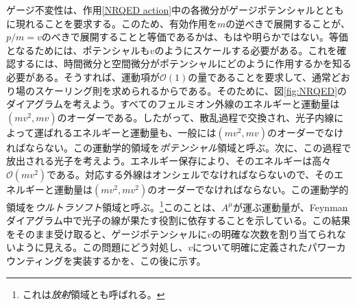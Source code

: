 ゲージ不変性は、作用\eqref{NRQED action}中の各微分がゲージポテンシャルとともに現れることを要求する。このため、有効作用を$m$の逆べきで展開することが、$p / m = v$のべきで展開することと等価であるかは、もはや明らかではない。等価となるためには、ポテンシャルも$v$のようにスケールする必要がある。これを確認するには、時間微分と空間微分がポテンシャルにどのように作用するかを知る必要がある。そうすれば、運動項が$\mathcal{O}(1)$の量であることを要求して、通常どおり場のスケーリング則を求められるからである。そのために、図\ref{fig:NRQED}のダイアグラムを考えよう。すべてのフェルミオン外線のエネルギーと運動量は$(mv^2, mv)$のオーダーである。したがって、散乱過程で交換され、光子内線によって運ばれるエネルギーと運動量も、一般には$(mv^2, mv)$のオーダーでなければならない。この運動学的領域を\emph{ポテンシャル}領域と呼ぶ。次に、この過程で放出される光子を考えよう。エネルギー保存により、そのエネルギーは高々$\mathcal{O}(mv^2)$である。対応する外線はオンシェルでなければならないので、そのエネルギーと運動量は$(mv^2, mv^2)$のオーダーでなければならない。この運動学的領域を\emph{ウルトラソフト}領域と呼ぶ。\footnote{これは\emph{放射}領域とも呼ばれる。}このことは、$A^\mu$が運ぶ運動量が、Feynmanダイアグラム中で光子の線が果たす役割に依存することを示している。この結果をそのまま受け取ると、ゲージポテンシャルに$v$の明確な次数を割り当てられないように見える。この問題にどう対処し、$v$について明確に定義されたパワーカウンティングを実装するかを、この後に示す。


